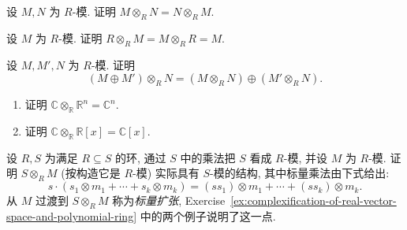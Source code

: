 \begin{BookExercises}
\begin{enumerate}
  \end{enumerate}
  \item\label{ex:tensor-product-commutes} 设 $M,N$ 为 $R$-模. 证明 $M\otimes_{R}N=N\otimes_{R}M$.
  \item\label{ex:ring-is-tensor-unit} 设 $M$ 为 $R$-模. 证明 $R\otimes_{R}M=M\otimes_{R}R=M$.
  \item\label{ex:tensor-distributes-over-direct-sum} 设 $M,M',N$ 为 $R$-模. 证明
  \[
    (M\oplus M')\otimes_{R}N=(M\otimes_{R}N)\oplus(M'\otimes_{R}N).
  \]
  \item\label{ex:complexification-of-real-vector-space-and-polynomial-ring}
  \begin{enumerate}
    \item 证明 $\mathbb{C}\otimes_{\mathbb{R}}\mathbb{R}^{n}=\mathbb{C}^{n}$.
    \item 证明 $\mathbb{C}\otimes_{\mathbb{R}}\mathbb{R}[x]=\mathbb{C}[x]$.
  \end{enumerate}
  \item\label{ex:extension-of-scalars-has-module-structure} 设 $R,S$ 为满足 $R\subseteq S$ 的环, 通过 $S$ 中的乘法把 $S$ 看成 $R$-模, 并设 $M$ 为 $R$-模. 证明 $S\otimes_{R}M$ (按构造它是 $R$-模) 实际具有 $S$-模的结构, 其中标量乘法由下式给出:
  \[
    s\cdot(s_{1}\otimes m_{1}+\cdots+s_{k}\otimes m_{k})
      =(ss_{1})\otimes m_{1}+\cdots+(ss_{k})\otimes m_{k}.
  \]
  从 $M$ 过渡到 $S\otimes_{R}M$ 称为\emph{标量扩张}, Exercise~\ref{ex:complexification-of-real-vector-space-and-polynomial-ring} 中的两个例子说明了这一点.
\end{BookExercises}
